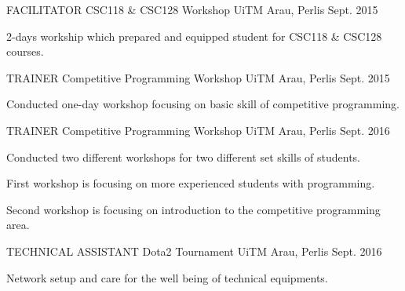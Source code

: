 

\begin{cventries}

  \cventry
    {FACILITATOR}
    {CSC118 \& CSC128 Workshop}
    {UiTM Arau, Perlis}
    {Sept. 2015}
    {
      \begin{cvitems}
        \item {2-days workship which prepared and equipped student for CSC118 \& CSC128 courses.}
      \end{cvitems}
    }

  \cventry
    {TRAINER}
    {Competitive Programming Workshop}
    {UiTM Arau, Perlis}
    {Sept. 2015}
    {
      \begin{cvitems}
        \item {Conducted one-day workshop focusing on basic skill of competitive programming.}
      \end{cvitems}
    }
    
  \cventry
    {TRAINER}
    {Competitive Programming Workshop}
    {UiTM Arau, Perlis}
    {Sept. 2016}
    {
      \begin{cvitems}
        \item {Conducted two different workshops for two different set skills of students.}
        \item {First workshop is focusing on more experienced students with programming.}
        \item {Second workshop is focusing on introduction to the competitive programming area.}
      \end{cvitems}
    }

  \cventry
    {TECHNICAL ASSISTANT}
    {Dota2 Tournament}
    {UiTM Arau, Perlis}
    {Sept. 2016}
    {
      \begin{cvitems}
        \item {Network setup and care for the well being of technical equipments.}
      \end{cvitems}
    }


\end{cventries}
